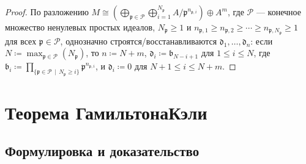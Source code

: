 \documentclass[
	extrafontsizes,
	11pt,
	hyphens,
]{memoir}
\begin{document}
\begin{proof}
По разложению
\(
M \cong (\bigoplus_{\mathfrak{p} \in \mathcal{P}} \bigoplus_{i = 1}^{N_\mathfrak{p}} A/{\mathfrak{p}}^{n_{\mathfrak{p},i}}) \oplus A^m
\),
где \(\mathcal{P}\) --- конечное множество ненулевых простых идеалов,
\(N_\mathfrak{p} \geq 1\) и \(n_{\mathfrak{p},1} \geq n_{\mathfrak{p},2} \geq \cdots \geq n_{\mathfrak{p},N_\mathfrak{p}} \geq 1\) для всех \(\mathfrak{p} \in \mathcal{P}\),
однозначно строятся/вос\-ста\-нав\-ли\-ва\-ют\-ся \(\mathfrak{d}_1, \dots{}, \mathfrak{d}_n\):
если \(N \coloneqq \max_{\mathfrak{p} \in \mathcal{P}}(N_\mathfrak{p})\), то
\(n \coloneqq N + m\),
\(\mathfrak{d}_i \coloneqq \mathfrak{b}_{N-i+1}\) для \(1 \leq i \leq N\), где
\(\mathfrak{b}_i \coloneqq \prod_{\{\mathfrak{p} \in \mathcal{P} \,\mid\, N_\mathfrak{p} \geq i\}} \mathfrak{p}^{n_{\mathfrak{p},i}}\),
и \(\mathfrak{d}_i \coloneqq 0\) для \(N+1 \leq i \leq N+m\).
\end{proof}


\section{Теорема Гамильтона\namedash{}Кэли}

\subsection{Формулировка и доказательство}

%
\end{document}
